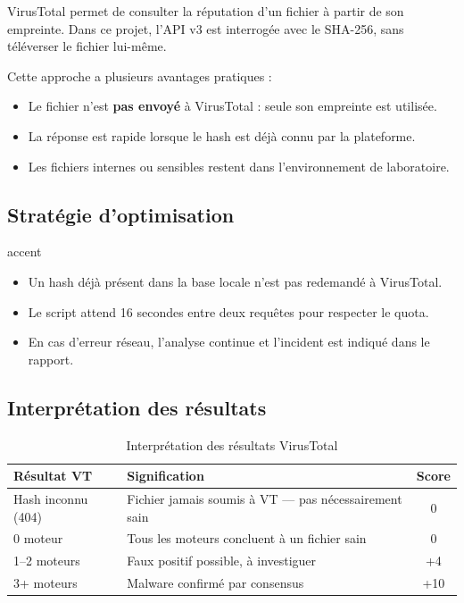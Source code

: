 \documentclass[12pt,a4paper]{article}
\begin{document}
VirusTotal permet de consulter la réputation d'un fichier à partir de son empreinte. Dans ce projet, l'API v3 est interrogée avec le SHA-256, sans téléverser le fichier lui-même.

Cette approche a plusieurs avantages pratiques :
\begin{itemize}[noitemsep]
  \item Le fichier n'est \textbf{pas envoyé} à VirusTotal : seule son empreinte est utilisée.
  \item La réponse est rapide lorsque le hash est déjà connu par la plateforme.
  \item Les fichiers internes ou sensibles restent dans l'environnement de laboratoire.
\end{itemize}

\subsection{Stratégie d'optimisation}

\begin{riskbox}[Gestion du quota API (tier gratuit = 4 req/min)]{accent}
  \color{white}
  \begin{itemize}[noitemsep]
    \item Un hash déjà présent dans la base locale n'est pas redemandé à VirusTotal.
    \item Le script attend 16 secondes entre deux requêtes pour respecter le quota.
    \item En cas d'erreur réseau, l'analyse continue et l'incident est indiqué dans le rapport.
  \end{itemize}
\end{riskbox}

\subsection{Interprétation des résultats}

\begin{table}[h!]
  \centering
  \begin{tabularx}{\textwidth}{lXc}
    \toprule
    \textbf{Résultat VT} & \textbf{Signification} & \textbf{Score} \\
    \midrule
    Hash inconnu (404)   & Fichier jamais soumis à VT — pas nécessairement sain & 0 \\
    0 moteur             & Tous les moteurs concluent à un fichier sain & 0 \\
    1--2 moteurs         & Faux positif possible, à investiguer & +4 \\
    3+ moteurs           & Malware confirmé par consensus & +10 \\
    \bottomrule
  \end{tabularx}
  \caption{Interprétation des résultats VirusTotal}
\end{table}
\end{document}
